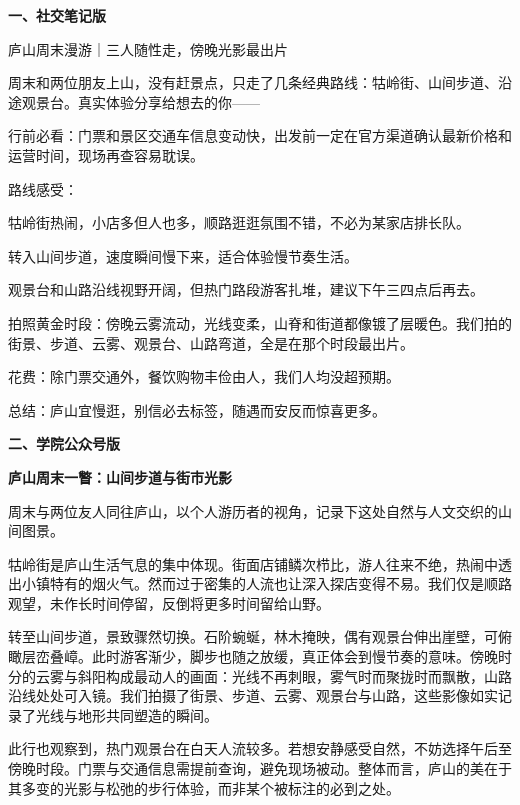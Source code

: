 \begin{aibox}
\textbf{一、社交笔记版}

庐山周末漫游｜三人随性走，傍晚光影最出片

周末和两位朋友上山，没有赶景点，只走了几条经典路线：牯岭街、山间步道、沿途观景台。真实体验分享给想去的你——

行前必看：门票和景区交通车信息变动快，出发前一定在官方渠道确认最新价格和运营时间，现场再查容易耽误。

路线感受：

牯岭街热闹，小店多但人也多，顺路逛逛氛围不错，不必为某家店排长队。

转入山间步道，速度瞬间慢下来，适合体验慢节奏生活。

观景台和山路沿线视野开阔，但热门路段游客扎堆，建议下午三四点后再去。

拍照黄金时段：傍晚云雾流动，光线变柔，山脊和街道都像镀了层暖色。我们拍的街景、步道、云雾、观景台、山路弯道，全是在那个时段最出片。

花费：除门票交通外，餐饮购物丰俭由人，我们人均没超预期。

总结：庐山宜慢逛，别信必去标签，随遇而安反而惊喜更多。

\textbf{二、学院公众号版}

\begin{center}
\textbf{庐山周末一瞥：山间步道与街市光影}
\end{center}

\par\qquad 周末与两位友人同往庐山，以个人游历者的视角，记录下这处自然与人文交织的山间图景。

\par\qquad 牯岭街是庐山生活气息的集中体现。街面店铺鳞次栉比，游人往来不绝，热闹中透出小镇特有的烟火气。然而过于密集的人流也让深入探店变得不易。我们仅是顺路观望，未作长时间停留，反倒将更多时间留给山野。

\par\qquad 转至山间步道，景致骤然切换。石阶蜿蜒，林木掩映，偶有观景台伸出崖壁，可俯瞰层峦叠嶂。此时游客渐少，脚步也随之放缓，真正体会到慢节奏的意味。傍晚时分的云雾与斜阳构成最动人的画面：光线不再刺眼，雾气时而聚拢时而飘散，山路沿线处处可入镜。我们拍摄了街景、步道、云雾、观景台与山路，这些影像如实记录了光线与地形共同塑造的瞬间。

\par\qquad 此行也观察到，热门观景台在白天人流较多。若想安静感受自然，不妨选择午后至傍晚时段。门票与交通信息需提前查询，避免现场被动。整体而言，庐山的美在于其多变的光影与松弛的步行体验，而非某个被标注的必到之处。


\end{aibox}
